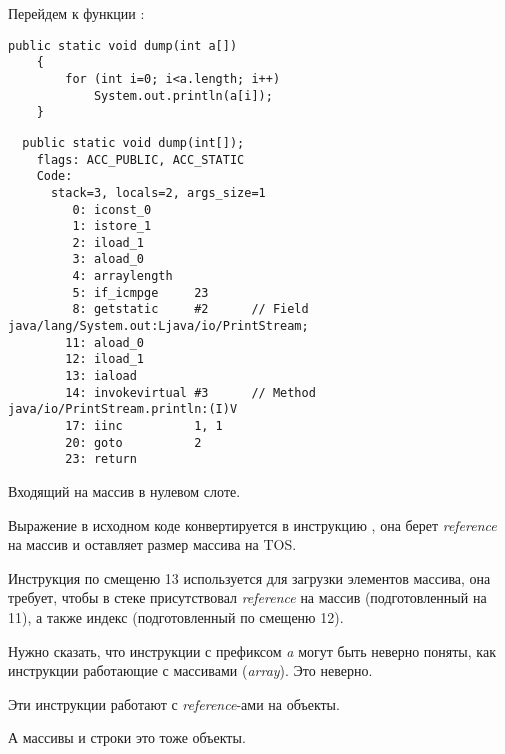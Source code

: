 Перейдем к функции :

\begin{lstlisting}[style=customjava]
	public static void dump(int a[])
	{
		for (int i=0; i<a.length; i++)
			System.out.println(a[i]);
	}
\end{lstlisting}

\begin{lstlisting}
  public static void dump(int[]);
    flags: ACC_PUBLIC, ACC_STATIC
    Code:
      stack=3, locals=2, args_size=1
         0: iconst_0      
         1: istore_1      
         2: iload_1       
         3: aload_0       
         4: arraylength   
         5: if_icmpge     23
         8: getstatic     #2      // Field java/lang/System.out:Ljava/io/PrintStream;
        11: aload_0       
        12: iload_1       
        13: iaload        
        14: invokevirtual #3      // Method java/io/PrintStream.println:(I)V
        17: iinc          1, 1
        20: goto          2
        23: return        
\end{lstlisting}

Входящий  на массив в нулевом слоте.

Выражение  в исходном коде конвертируется в инструкцию ,
она берет \emph{reference} на массив и оставляет размер массива на \ac{TOS}.

Инструкция  по смещеню 13 используется для загрузки элементов массива, 
она требует, чтобы в стеке присутствовал \emph{reference} на массив
(подготовленный  на 11), 
а также индекс (подготовленный  по смещеню 12).

Нужно сказать, что инструкции с префиксом \emph{a} могут быть неверно поняты, 
как инструкции работающие с массивами (\emph{array}).
Это неверно.

Эти инструкции работают с \emph{reference}-ами на объекты.

А массивы и строки это тоже объекты.
